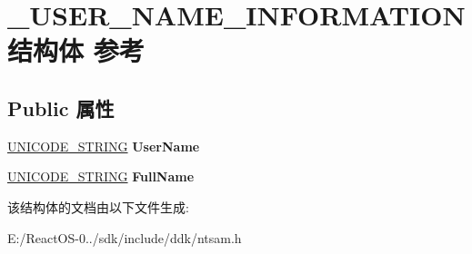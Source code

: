 \hypertarget{struct___u_s_e_r___n_a_m_e___i_n_f_o_r_m_a_t_i_o_n}{}\section{\+\_\+\+U\+S\+E\+R\+\_\+\+N\+A\+M\+E\+\_\+\+I\+N\+F\+O\+R\+M\+A\+T\+I\+O\+N结构体 参考}
\label{struct___u_s_e_r___n_a_m_e___i_n_f_o_r_m_a_t_i_o_n}
\subsection*{Public 属性}
\begin{DoxyCompactItemize}
\item 
\mbox{\label{struct___u_s_e_r___n_a_m_e___i_n_f_o_r_m_a_t_i_o_n_ad5402c48b4a54296007fc13936101260}} 
\hyperlink{struct___u_n_i_c_o_d_e___s_t_r_i_n_g}{U\+N\+I\+C\+O\+D\+E\+\_\+\+S\+T\+R\+I\+NG} {\bfseries User\+Name}
\item 
\mbox{\label{struct___u_s_e_r___n_a_m_e___i_n_f_o_r_m_a_t_i_o_n_a0f0a6a03bd833a87acd6aee16ba1f31a}} 
\hyperlink{struct___u_n_i_c_o_d_e___s_t_r_i_n_g}{U\+N\+I\+C\+O\+D\+E\+\_\+\+S\+T\+R\+I\+NG} {\bfseries Full\+Name}
\end{DoxyCompactItemize}


该结构体的文档由以下文件生成\+:\begin{DoxyCompactItemize}
\item 
E\+:/\+React\+O\+S-\/0../sdk/include/ddk/ntsam.\+h\end{DoxyCompactItemize}
